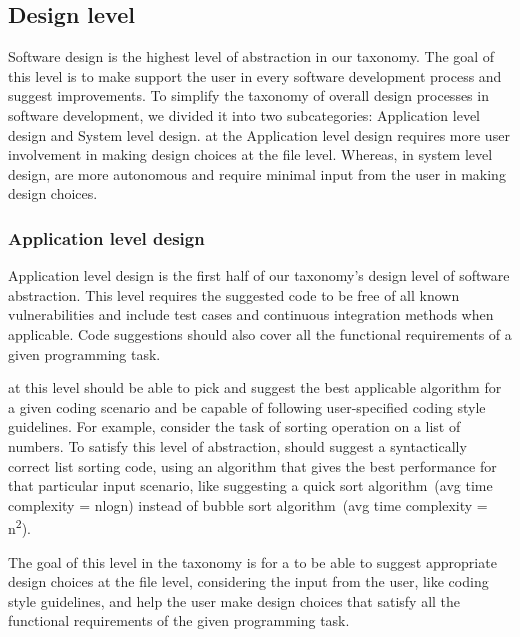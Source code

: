 \subsection{Design level}
Software design is the highest level of abstraction in our taxonomy. The goal of this level is to make \cct{} support the user in every software development process and suggest improvements.
To simplify the taxonomy of overall design processes in software development, we divided it into two subcategories: Application level design and System level design. 
\cct{} at the Application level design requires more user involvement in making design choices at the file level. Whereas, in system level design, \cct{} are more autonomous and require minimal input from the user in making design choices.

\subsubsection{Application level design}
\label{low_design}
Application level design is the first half of our taxonomy's design level of software abstraction.
This level requires the suggested code to be free of all known vulnerabilities and include test cases and continuous integration methods when applicable.
Code suggestions should also cover all the functional requirements of a given programming task.

\cct{} at this level should be able to pick and suggest the best applicable algorithm for a given coding scenario and be capable of following user-specified coding style guidelines.
For example, consider the task of sorting operation on a list of numbers. To satisfy this level of abstraction, \cct{} should suggest a syntactically correct list sorting code, using an algorithm that gives the best performance for that particular input scenario, like suggesting a quick sort algorithm~(avg time complexity = nlogn) instead of bubble sort algorithm~(avg time complexity = n\textsuperscript{2}).

The goal of this level in the taxonomy is for a \cct{} to be able to suggest appropriate design choices at the file level, considering the input from the user, like coding style guidelines, and help the user make design choices that satisfy all the functional requirements of the given programming task.

